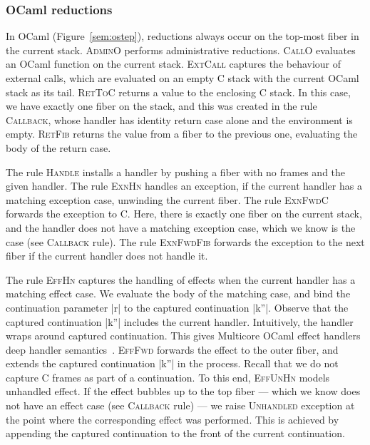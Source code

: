 \documentclass[sigplan,screen]{acmart}
\begin{document}
\subsubsection{OCaml reductions}

In OCaml (Figure~\ref{sem:ostep}), reductions always occur on the top-most
fiber in the current stack. \textsc{AdminO} performs administrative reductions.
\textsc{CallO} evaluates an OCaml function on the current stack.
\textsc{ExtCall} captures the behaviour of external calls, which are evaluated
on an empty C stack with the current OCaml stack as its tail. \textsc{RetToC}
returns a value to the enclosing C stack. In this case, we have exactly one
fiber on the stack, and this was created in the rule \textsc{Callback}, whose
handler has identity return case alone and the environment is empty.
\textsc{RetFib} returns the value from a fiber to the previous one, evaluating the
body of the return case.

The rule \textsc{Handle} installs a handler by pushing a fiber with no frames
and the given handler. The rule \textsc{ExnHn} handles an exception, if the
current handler has a matching exception case, unwinding the current fiber. The
rule \textsc{ExnFwdC} forwards the exception to C. Here, there is exactly one
fiber on the current stack, and the handler does not have a matching exception
case, which we know is the case (see \textsc{Callback} rule). The rule
\textsc{ExnFwdFib} forwards the exception to the next fiber if the current
handler does not handle it.

The rule \textsc{EffHn} captures the handling of effects when the current
handler has a matching effect case. We evaluate the body of the matching case,
and bind the continuation parameter |r| to the captured continuation |k''|.
Observe that the captured continuation |k''| includes the current handler.
Intuitively, the handler wraps around captured continuation. This gives
Multicore OCaml effect handlers deep handler semantics~\cite{Hillerstrom20}.
\textsc{EffFwd} forwards the effect to the outer fiber, and extends the
captured continuation |k''| in the process. Recall that we do not capture C
frames as part of a continuation. To this end, \textsc{EffUnHn} models
unhandled effect. If the effect bubbles up to the top fiber --- which we know does
not have an effect case (see \textsc{Callback} rule) --- we raise
\textsc{Unhandled} exception at the point where the corresponding effect was
performed. This is achieved by appending the captured continuation to the front
of the current continuation.
\end{document}
